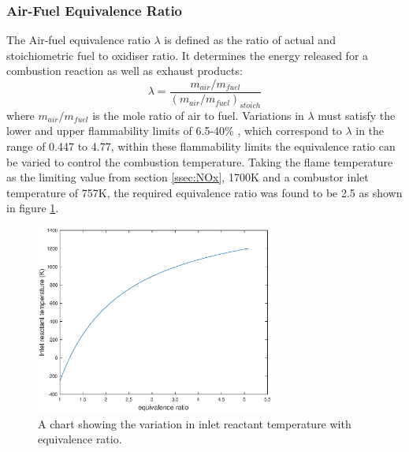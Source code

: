 \documentclass[11pt, oneside]{article}
\begin{document}
\subsubsection{Air-Fuel Equivalence Ratio} 
The Air-fuel equivalence ratio $\lambda$ is defined as the ratio of actual and stoichiometric fuel to oxidiser ratio. It determines the energy released for a combustion reaction as well as exhaust products: \begin{equation}
\lambda = \frac{m_{air}/m_{fuel}}{(m_{air}/m_{fuel})_{stoich}}
\end{equation}
where $m_{air}/m_{fuel}$ is the mole ratio of air to fuel. Variations in $\lambda$ must satisfy the lower and upper flammability limits of 6.5-40\% \cite{LFL}, which correspond to $\lambda$ in the range of 0.447 to 4.77, within these flammability limits the equivalence ratio can be varied to control the combustion temperature.
Taking the flame temperature as the limiting value from section \ref{ssec:NOx}, 1700K and a combustor inlet temperature of 757K, the required equivalence ratio was found to be 2.5 as shown in figure \ref{fig:flametemp}.

\begin{figure} [h]
\centering
\includegraphics[width=0.7\textwidth]{./pictures/combustor.eps}
  \caption{A chart showing the variation in inlet reactant temperature with equivalence ratio.} \label{fig:flametemp}
  \end{figure} 
\end{document}
